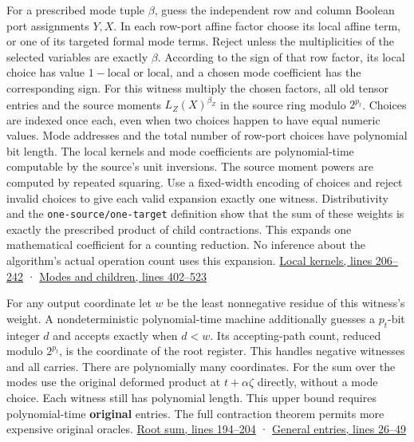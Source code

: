 \documentclass[
  11pt,
]{article}
\begin{document}
For a prescribed mode tuple \(\beta\), guess the independent row and
column Boolean port assignments \(Y,X\). In each row-port affine factor
choose its local affine term, or one of its targeted formal mode terms.
Reject unless the multiplicities of the selected variables are exactly
\(\beta\). According to the sign of that row factor, its local choice
has value \(1-\mathrm{local}\) or \(\mathrm{local}\), and a chosen mode
coefficient has the corresponding sign. For this witness multiply the
chosen factors, all old tensor entries and the source moments
\(L_Z(X)^{\beta_Z}\) in the source ring modulo \(2^{p_t}\). Choices are
indexed once each, even when two choices happen to have equal numeric
values. Mode addresses and the total number of row-port choices have
polynomial bit length. The local kernels and mode coefficients are
polynomial-time computable by the source's unit inversions. The source
moment powers are computed by repeated squaring. Use a fixed-width
encoding of choices and reject invalid choices to give each valid
expansion exactly one witness. Distributivity and the
\nolinkurl{one-source/one-target} definition show that the sum of these
weights is exactly the prescribed product of child contractions. This
expands one mathematical coefficient for a counting reduction. No
inference about the algorithm's actual operation count uses this
expansion.
\href{https://github.com/openai/math/blob/main/preprints/The-Exponential-Time-Hypothesis-is-False-October-25-2026/build/quantitative-contraction.tex\#L206}{Local
kernels, lines 206--242} ·
\href{https://github.com/openai/math/blob/main/preprints/The-Exponential-Time-Hypothesis-is-False-October-25-2026/build/quantitative-contraction.tex\#L402}{Modes
and children, lines 402--523}

For any output coordinate let \(w\) be the least nonnegative residue of
this witness's weight. A nondeterministic polynomial-time machine
additionally guesses a \(p_t\)-bit integer \(d\) and accepts exactly
when \(d<w\). Its accepting-path count, reduced modulo \(2^{p_t}\), is
the coordinate of the root register. This handles negative witnesses and
all carries. There are polynomially many coordinates. For the sum over
the modes use the original deformed product at \(t+\alpha\zeta\)
directly, without a mode choice. Each witness still has polynomial
length. This upper bound requires polynomial-time \textbf{original}
entries. The full contraction theorem permits more expensive original
oracles.
\href{https://github.com/openai/math/blob/main/preprints/The-Exponential-Time-Hypothesis-is-False-October-25-2026/build/quantitative-contraction.tex\#L194}{Root
sum, lines 194--204} ·
\href{https://github.com/openai/math/blob/main/preprints/The-Exponential-Time-Hypothesis-is-False-October-25-2026/build/quantitative-reduction.tex\#L26}{General
entries, lines 26--49}
\end{document}
